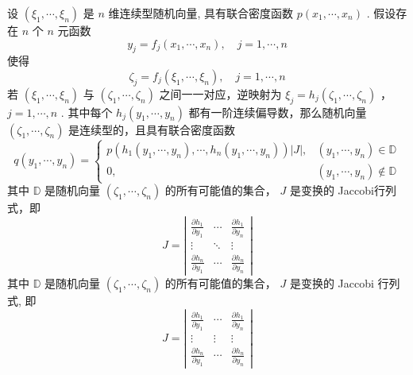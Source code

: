 \begin{theorem}[n维密度变换公式]\label{eq:n-dimensional_density_transform}
    设 $\left(\xi_1, \cdots, \xi_n\right)$ 是 $n$ 维连续型随机向量, 具有联合密度函数 $p\left(x_1, \cdots, x_n\right)$ . 假设存在 $n$ 个 $n$ 元函数
    $$
        y_j=f_j\left(x_1, \cdots, x_n\right), \quad j=1, \cdots, n
    $$
    使得
    $$
        \zeta_j=f_j\left(\xi_1, \cdots, \xi_n\right), \quad j=1, \cdots, n
    $$
    若 $\left(\xi_1, \cdots, \xi_n\right)$ 与 $\left(\zeta_1, \cdots, \zeta_n\right)$ 之间一一对应，逆映射为 $\xi_j=h_j\left(\zeta_1, \cdots, \zeta_n\right)$ ， $j=1, \cdots, n$ . 其中每个 $h_j\left(y_1, \cdots, y_n\right)$ 都有一阶连续偏导数，那么随机向量 $\left(\zeta_1, \cdots, \zeta_n\right)$ 是连续型的，且具有联合密度函数
    $$
        q\left(y_1, \cdots, y_n\right)=\left\{\begin{array}{cl}
            p\left(h_1\left(y_1, \cdots, y_n\right), \cdots, h_n\left(y_1, \cdots, y_n\right)\right)|J|, & \left(y_1, \cdots, y_n\right) \in \mathbb{D}    \\
            0,                                                                                           & \left(y_1, \cdots, y_n\right) \notin \mathbb{D}
        \end{array}\right.
    $$
    其中 $\mathbb{D}$ 是随机向量 $\left(\zeta_1, \cdots, \zeta_n\right)$ 的所有可能值的集合， $J$ 是变换的 Jaccobi行列式，即
    $$
        J=\left|\begin{array}{ccc}
            \frac{\partial h_1}{\partial y_1} & \cdots & \frac{\partial h_1}{\partial y_n} \\
            \vdots                            & \ddots & \vdots                            \\
            \frac{\partial h_n}{\partial y_1} & \cdots & \frac{\partial h_n}{\partial y_n}
        \end{array}\right|
    $$
    其中 $\mathbb{D}$ 是随机向量 $\left(\zeta_1, \cdots, \zeta_n\right)$ 的所有可能值的集合， $J$ 是变换的 Jaccobi 行列式, 即
    $$
        J=\left|\begin{array}{ccc}
            \frac{\partial h_1}{\partial y_1} & \cdots & \frac{\partial h_1}{\partial y_n} \\
            \vdots                            & \vdots & \vdots                            \\
            \frac{\partial h_n}{\partial y_1} & \cdots & \frac{\partial h_n}{\partial y_n}
        \end{array}\right|
    $$
\end{theorem}
